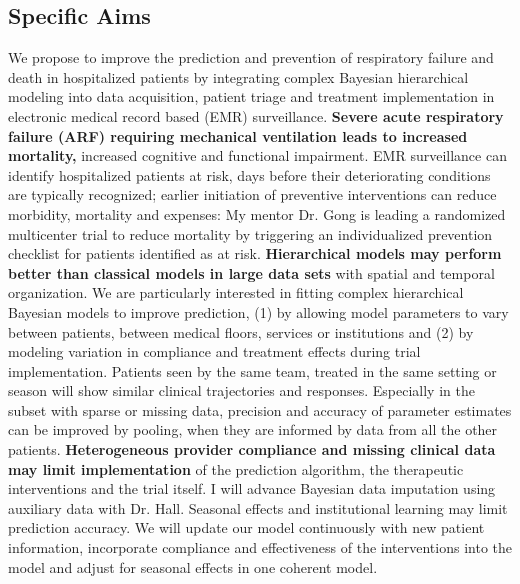 \documentclass[11pt,notitlepage]{article}
\begin{document}

\subsection*{Specific Aims}
We propose to improve the prediction \cite{Tatro2013} and prevention of respiratory failure and death in hospitalized patients by integrating complex Bayesian hierarchical modeling into data acquisition, patient triage and treatment implementation in electronic medical record based (EMR) surveillance.\newline
\textbf{Severe acute respiratory failure (ARF) requiring mechanical ventilation leads to increased mortality,} increased cognitive and functional impairment. EMR surveillance can identify hospitalized patients at risk, days before their deteriorating conditions are typically recognized; earlier initiation of preventive interventions can reduce morbidity, mortality and expenses: My mentor Dr. Gong is leading a randomized multicenter trial to reduce mortality by triggering an individualized prevention checklist for patients identified as at risk. \newline
\textbf{Hierarchical models may perform better than classical models in large data sets} with spatial and temporal organization.
We are particularly interested in fitting complex hierarchical Bayesian models to improve prediction, (1) by allowing model parameters to vary between patients, between medical floors, services or institutions and (2) by modeling variation in compliance and treatment effects during trial implementation. Patients seen by the same team, treated in the same setting or season will show similar clinical trajectories and responses. Especially in the subset with sparse or missing data, precision and accuracy of parameter estimates can be improved by pooling, when they are informed by data from all the other patients. 
\newline \textbf{Heterogeneous provider compliance and missing clinical data may limit implementation} of the prediction algorithm, the therapeutic interventions and the trial itself. I will advance Bayesian data imputation using auxiliary data with Dr. Hall. Seasonal effects and institutional learning may limit prediction accuracy. We will update our model continuously with new patient information, incorporate compliance and effectiveness of the interventions into the model and adjust for seasonal effects in one coherent model.
\end{document}

